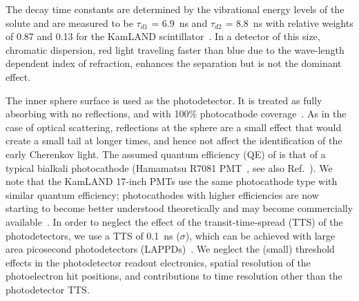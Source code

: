 The decay time constants are determined by the vibrational energy
levels of the solute and are measured to be $\tau_{d1}$ = 6.9~ns and
$\tau_{d2}$ = 8.8~ns with relative weights of 0.87 and 0.13 for the
KamLAND scintillator~\cite{tajimaThesis}. In a detector of this size,
chromatic dispersion, red light traveling faster than blue due to the
wave-length dependent index of refraction, enhances the separation but
is not the dominant effect.

The inner sphere surface is used as the photodetector. It is treated
as fully absorbing with no reflections, and with 100\% photocathode
coverage~\cite{Juno_coverage}. As in the case of optical scattering,
reflections at the sphere are a small effect that would create a small
tail at longer times, and hence not affect the identification of the
early Cherenkov light. The assumed quantum efficiency (QE) of is that
of a typical bialkali photocathode (Hamamatsu R7081
PMT~\cite{Hamamatsu_R7081}, see also Ref.~\cite{dctwo}). We note that
the KamLAND 17-inch PMTs use the same photocathode type with similar
quantum efficiency; photocathodes with higher efficiencies are now
starting to become better understood theoretically and may become
commercially available~\cite{Photonis, Smedley, Cultrera}.  In order to
neglect the effect of the transit-time-spread (TTS) of the
photodetectors, we use a TTS of 0.1~ns ($\sigma$), which can be
achieved with large area picosecond photodetectors
(LAPPDs)~\cite{anode_paper,PSEC4_paper,RSI_paper,Vienna2013,Ceramic_paper1,HV_paper,Timing_paper,Incom_paper}.
We neglect the (small) threshold effects in the photodetector readout
electronics, spatial resolution of the photoelectron hit positions,
and contributions to time resolution other than the photodetector TTS.

